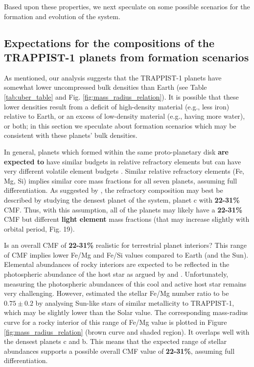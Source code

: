 \documentclass[twocolumn]{aastex63}
\begin{document}
Based upon these properties, we next speculate on some possible scenarios for the formation and evolution of the
system.

\subsection{Expectations for the compositions of the TRAPPIST-1 planets from formation scenarios} \label{sec:formation}

As mentioned, our analysis suggests that the TRAPPIST-1 planets have somewhat lower uncompressed bulk densities than Earth (see Table \ref{tab:uber_table} and Fig. \ref{fig:mass_radius_relation}).  It is possible that these lower densities result from a deficit of high-density material (e.g., less iron) relative to Earth, or an excess of low-density material (e.g., having more water), or both;  in this section we speculate about formation scenarios which may be consistent with these planets' bulk densities.

In general, planets which formed within the same proto-planetary disk \textbf{are expected to} have similar budgets in relative refractory elements \citep{bond2010making,elser2012origin} but can have
very different volatile element budgets \citep{oberg2016excess}. Similar relative refractory elements (Fe, Mg, Si) implies
similar core mass fractions for all seven planets, assuming full differentiation. As suggested by \citet{Dorn2018}, the refractory composition may best be described by studying the densest planet of the system, planet c with \textbf{22-31\%} CMF. Thus, with this assumption, all of the planets may likely have a \textbf{22-31\%} CMF but different \textbf{light element} mass fractions (that may increase slightly with orbital period, Fig. 19).

Is an overall CMF of \textbf{22-31\%} realistic for terrestrial planet interiors? This range of CMF implies lower Fe/Mg and Fe/Si values compared to Earth (and the Sun). Elemental abundances of rocky interiors are expected to be reflected in the photospheric abundance of the host star as argued by \citet{Unterborn2018a} and \citet{Dorn2018}. Unfortunately, measuring the photospheric abundances of this cool and active host star remains very challenging. However, \citet{Unterborn2018a} estimated the stellar Fe/Mg number ratio to be $0.75{\pm}0.2$ by analysing Sun-like stars of similar metallicity to TRAPPIST-1, which may be slightly lower than the Solar value. The corresponding mass-radius curve for a rocky interior of this range of Fe/Mg value is plotted in Figure \ref{fig:mass_radius_relation} (brown curve and shaded region). It overlaps well with the densest planets c and b. This means that the expected range of stellar abundances supports a possible overall CMF value of \textbf{22-31\%}, assuming full differentiation.
\end{document}
